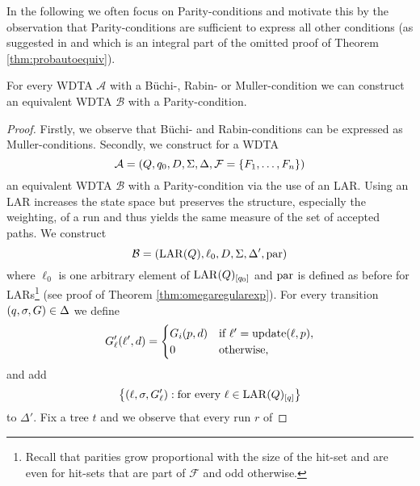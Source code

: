 In the following we often focus on Parity-conditions and motivate this by the
observation that Parity-conditions are sufficient to express all other 
conditions (as suggested in \cite[page 24:9, Proposition 6]{RandAutoInfTrees}
and which is an integral part of the omitted proof of Theorem 
\ref{thm:probautoequiv}).
\begin{lemma}
  For every \ac{WDTA} $\mathcal{A}$ with a Büchi-, Rabin- or Muller-condition 
  we can construct an equivalent \ac{WDTA} $\mathcal{B}$ with a 
  Parity-condition.
  \label{lem:wdtaparityexpressiveness}
\end{lemma}
\begin{proof}
  Firstly, we observe that Büchi- and Rabin-conditions can be expressed
  as Muller-conditions. Secondly, we construct for a 
  \ac{WDTA}
  \begin{equation*}
    \mathcal{A} = \left(
      Q, q_{0}, D, \Sigma, \Delta, \mathcal{F} = \left\{F_{1},\dots,F_{n}\right\}
    \right)
  \end{equation*}
  an equivalent \ac{WDTA} $\mathcal{B}$ with a Parity-condition via the use of
  an \ac{LAR}. Using an \ac{LAR} increases the state space but preserves the 
  structure, especially the weighting, of a run and thus yields the same 
  measure of the set of accepted paths. We construct
  \begin{equation*}
    \mathcal{B}=\left(
      \operatorname{LAR}(Q),\ell_{0}, D, \Sigma, \Delta', \operatorname{par}
    \right)
  \end{equation*} 
  where $\ell_{0}$ is one arbitrary element of $\operatorname{LAR}(Q)_{\left[q_{0}\right]}$ and 
  $\operatorname{par}$ is defined as before for \acp{LAR}\footnote{
    Recall that parities grow proportional with the size of the hit-set and are 
    even for hit-sets that are part of $\mathcal{F}$ and odd otherwise.
  } (see proof of Theorem \ref{thm:omegaregularexp}). For every transition 
  $\left(q,\sigma,G\right)\in\Delta$ we define
  \begin{equation*}
    G_{\ell}'(\ell', d) = \begin{cases}
      G_{i}(p,d) &\text{if }\ell' = \operatorname{update}(\ell,p),\\
      0          &\text{otherwise,}
    \end{cases}
  \end{equation*}
  and add
  \begin{equation*}
    \left\{
      \left(\ell,\sigma,G_{\ell}'\right):\text{for every }\ell\in
        \operatorname{LAR}(Q)_{\left[q\right]}
    \right\}
  \end{equation*}
  to $\Delta'$. Fix a tree $t$ and we observe that every run $r$ of 

\end{proof}
